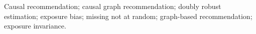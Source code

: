 Causal recommendation; causal graph recommendation; doubly robust estimation; exposure bias; missing not at random; graph-based recommendation; exposure invariance.
